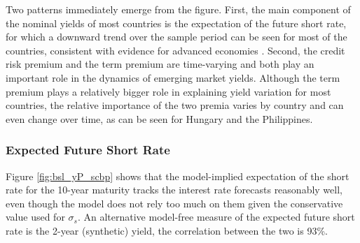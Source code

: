 {Two patterns immediately emerge from the figure. 
First, the main component of the nominal yields of most countries is the expectation of the future short rate, for which a downward trend over the sample period can be seen for most of the countries, consistent with evidence for advanced economies \citep{ACDM:2019}.
Second, the credit risk premium and the term premium are time-varying and both play an important role in the dynamics of emerging market yields.
Although the term premium plays a relatively bigger role 
in explaining yield variation for most countries,
the relative importance of the two premia varies by country and can even change over time, as can be seen for Hungary and the Philippines.


\subsubsection{Expected Future Short Rate}
\iftoggle{toclinks}{\gototoc}{} %

Figure \ref{fig:bsl_yP_scbp} shows that the model-implied expectation of the short rate for the 10-year maturity tracks the interest rate forecasts reasonably well, even though the model does not rely too much on them given the conservative value used for \(\sigma_s\).
An alternative model-free measure of the expected future short rate is the 2-year (synthetic) yield, the correlation between the two is 93\%.

%	

}
